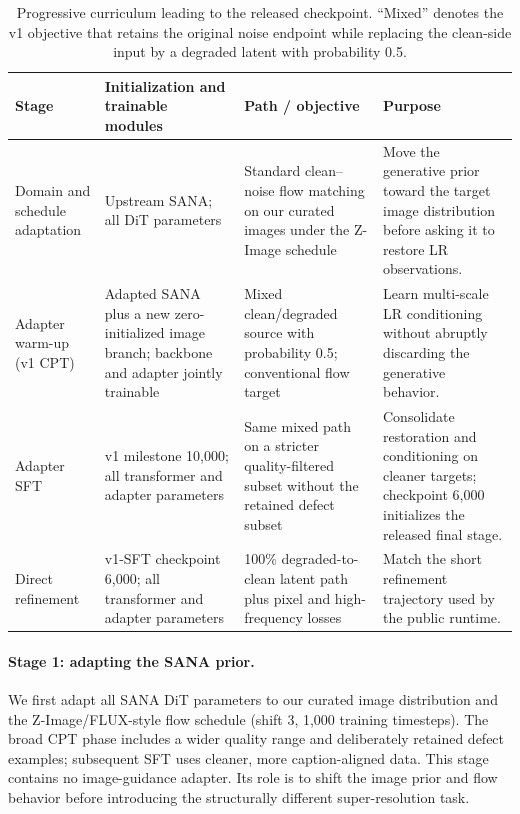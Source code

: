 \documentclass[10pt]{article}
\begin{document}
\begin{table}[t]
  \centering
  \caption{Progressive curriculum leading to the released checkpoint. ``Mixed''
  denotes the v1 objective that retains the original noise endpoint while
  replacing the clean-side input by a degraded latent with probability 0.5.}
  \label{tab:curriculum}
  \small
  \begin{tabular}{p{}p{}p{}p{}}
    \toprule
    Stage & Initialization and trainable modules & Path / objective & Purpose\\
    \midrule
    Domain and schedule adaptation &
    Upstream SANA; all DiT parameters &
    Standard clean--noise flow matching on our curated images under the
    Z-Image schedule &
    Move the generative prior toward the target image distribution before
    asking it to restore LR observations.\\
    Adapter warm-up (v1 CPT) &
    Adapted SANA plus a new zero-initialized image branch; backbone and adapter
    jointly trainable &
    Mixed clean/degraded source with probability 0.5; conventional flow target &
    Learn multi-scale LR conditioning without abruptly discarding the
    generative behavior.\\
    Adapter SFT &
    v1 milestone 10,000; all transformer and adapter parameters &
    Same mixed path on a stricter quality-filtered subset without the retained
    defect subset &
    Consolidate restoration and conditioning on cleaner targets; checkpoint
    6,000 initializes the released final stage.\\
    Direct refinement &
    v1-SFT checkpoint 6,000; all transformer and adapter parameters &
    100\% degraded-to-clean latent path plus pixel and high-frequency losses &
    Match the short refinement trajectory used by the public runtime.\\
    \bottomrule
  \end{tabular}
\end{table}

\paragraph{Stage 1: adapting the SANA prior.}
We first adapt all SANA DiT parameters to our curated image distribution and
the Z-Image/FLUX-style flow schedule (shift 3, 1,000 training timesteps).
The broad CPT phase includes a wider quality range and deliberately retained
defect examples; subsequent SFT uses cleaner, more caption-aligned data. This
stage contains no image-guidance adapter. Its role is to shift the image prior
and flow behavior before introducing the structurally different
super-resolution task.
\end{document}
